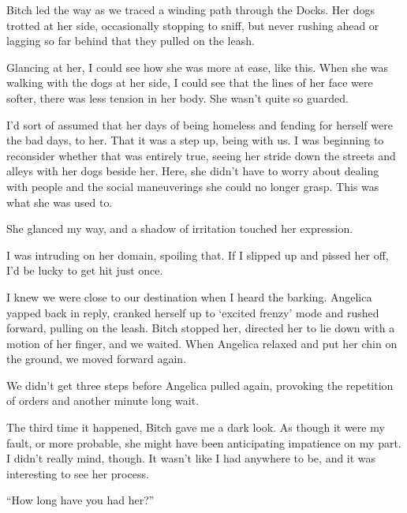 





Bitch led the way as we traced a winding path through the Docks.  Her dogs trotted at her side, occasionally stopping to sniff, but never rushing ahead or lagging so far behind that they pulled on the leash.



Glancing at her, I could see how she was more at ease, like this.   When she was walking with the dogs at her side, I could see that the lines of her face were softer, there was less tension in her body.  She wasn't quite so guarded.



I'd sort of assumed that her days of being homeless and fending for herself were the bad days, to her.  That it was a step up, being with us.  I was beginning to reconsider whether that was entirely true, seeing her stride down the streets and alleys with her dogs beside her.  Here, she didn't have to worry about dealing with people and the social maneuverings she could no longer grasp.  This was what she was used to.



She glanced my way, and a shadow of irritation touched her expression.



I was intruding on her domain, spoiling that.  If I slipped up and pissed her off, I'd be lucky to get hit just once.



I knew we were close to our destination when I heard the barking.  Angelica yapped back in reply, cranked herself up to `excited frenzy' mode and rushed forward, pulling on the leash.  Bitch stopped her, directed her to lie down with a motion of her finger, and we waited.  When Angelica relaxed and put her chin on the ground, we moved forward again.



We didn't get three steps before Angelica pulled again, provoking the repetition of orders and another minute long wait.



The third time it happened, Bitch gave me a dark look.  As though it were my fault, or more probable, she might have been anticipating impatience on my part.  I didn't really mind, though.  It wasn't like I had anywhere to be, and it was interesting to see her process.



``How long have you had her?''



